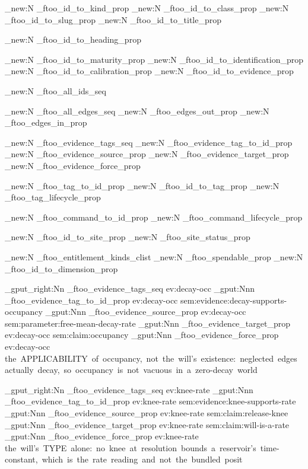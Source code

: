 
\ExplSyntaxOn


\prop_new:N \g_ftoo_id_to_kind_prop
\prop_new:N \g_ftoo_id_to_class_prop
\prop_new:N \g_ftoo_id_to_slug_prop
\prop_new:N \g_ftoo_id_to_title_prop

\prop_new:N \g_ftoo_id_to_heading_prop

\prop_new:N \g_ftoo_id_to_maturity_prop
\prop_new:N \g_ftoo_id_to_identification_prop
\prop_new:N \g_ftoo_id_to_calibration_prop
\prop_new:N \g_ftoo_id_to_evidence_prop

\seq_new:N \g_ftoo_all_ids_seq


\seq_new:N \g_ftoo_all_edges_seq
\prop_new:N \g_ftoo_edges_out_prop
\prop_new:N \g_ftoo_edges_in_prop


\seq_new:N \g_ftoo_evidence_tags_seq
\prop_new:N \g_ftoo_evidence_tag_to_id_prop
\prop_new:N \g_ftoo_evidence_source_prop
\prop_new:N \g_ftoo_evidence_target_prop
\prop_new:N \g_ftoo_evidence_force_prop

\prop_new:N \g_ftoo_tag_to_id_prop
\prop_new:N \g_ftoo_id_to_tag_prop
\prop_new:N \g_ftoo_tag_lifecycle_prop

\prop_new:N \g_ftoo_command_to_id_prop
\prop_new:N \g_ftoo_command_lifecycle_prop

\prop_new:N \g_ftoo_id_to_site_prop
\prop_new:N \g_ftoo_site_status_prop


\clist_new:N \g_ftoo_entitlement_kinds_clist
\prop_new:N \g_ftoo_spendable_prop
\prop_new:N \g_ftoo_id_to_dimension_prop


\seq_gput_right:Nn \g_ftoo_evidence_tags_seq { ev:decay-occ }
\prop_gput:Nnn \g_ftoo_evidence_tag_to_id_prop { ev:decay-occ } { sem:evidence:decay-supports-occupancy }
\prop_gput:Nnn \g_ftoo_evidence_source_prop { ev:decay-occ } { sem:parameter:free-mean-decay-rate }
\prop_gput:Nnn \g_ftoo_evidence_target_prop { ev:decay-occ } { sem:claim:occupancy }
\prop_gput:Nnn \g_ftoo_evidence_force_prop { ev:decay-occ } { the~APPLICABILITY~of~occupancy,~not~the~will's~existence:~neglected~edges~actually~decay,~so~occupancy~is~not~vacuous~in~a~zero-decay~world }

\seq_gput_right:Nn \g_ftoo_evidence_tags_seq { ev:knee-rate }
\prop_gput:Nnn \g_ftoo_evidence_tag_to_id_prop { ev:knee-rate } { sem:evidence:knee-supports-rate }
\prop_gput:Nnn \g_ftoo_evidence_source_prop { ev:knee-rate } { sem:claim:release-knee }
\prop_gput:Nnn \g_ftoo_evidence_target_prop { ev:knee-rate } { sem:claim:will-is-a-rate }
\prop_gput:Nnn \g_ftoo_evidence_force_prop { ev:knee-rate } { the~will's~TYPE~alone:~no~knee~at~resolution~bounds~a~reservoir's~time-constant,~which~is~the~rate~reading~and~not~the~bundled~posit }

